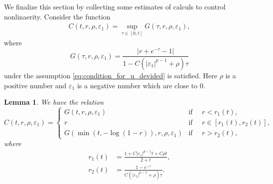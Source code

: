 \documentclass[reqno]{amsart}
\newtheorem{Lemma}[Theorem]{Lemma}
\begin{document}
We finalize this section
by collecting some estimates of calculs to control nonlinaerity.
Consider the function
	\begin{align}\label{eq.dC}
	C(t,r,\rho,\varepsilon_1)
	= \sup_{\tau \in [0,t]} G(\tau,r,\rho,\varepsilon_1),
	\end{align}
where
	\[
	G(\tau,r,\rho,\varepsilon_1)
	= \frac{ | r + e^{-\tau} - 1 |}{1-C ( |\varepsilon_1|^{p-1} + \rho ) \tau}
	\]
under the assumption \eqref{eq:condition_for_u_devided} is satisfied.
Here $\rho$ is a positive number and $\varepsilon_1$ is a negative number
which are close to $0$.

\begin{Lemma}\label{l.61}
We have the relation
	\[
	C(t,r,\rho, \varepsilon_1)
	= \begin{cases}
	G(t,r,\rho, \varepsilon_1) & \text{if } \quad r < r_1(t), \\
	r & \text{if } \quad r \in [r_1(t), r_2(t)], \\
	G(\min(t,- \log(1-r)),r,\rho, \varepsilon_1) & \text{if } \quad r > r_2(t),
	\end{cases}
	\]
where
	\begin{align*}
	r_1(t)
	&= \frac{1+C | \varepsilon_1|^{p-1} t + C \rho t}{2 + t},\\
	r_2(t)
	&= \frac{1-e^{-\tau}}{C ( |\varepsilon_1|^{p-1} + \rho ) \tau}.
	\end{align*}
\end{Lemma}
\end{document}

